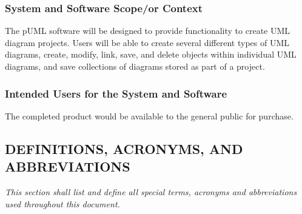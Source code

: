 \documentclass[twoside,letterpaper]{article}
\begin{document}
{\subsubsection[System and Software Scope/or Context]{System and Software
Scope/or Context}
{\color{black}
The pUML software will be designed to provide functionality to create UML diagram projects.  Users will be able to create several different types of UML diagrams, create, modify, link, save, and delete objects within individual UML diagrams, and save collections of diagrams stored as part of a project.
}

\subsubsection{Intended Users for the System and Software}
{\color{black}
The completed product would be available to the general public for purchase.
}


\clearpage
\subsection[DEFINITIONS, ACRONYMS, AND
ABBREVIATIONS]{\bfseries\color{black}
DEFINITIONS, ACRONYMS, AND ABBREVIATIONS}
{\itshape\color{black}
This section shall list and define all special terms, acronyms and
abbreviations used throughout this document.}


}
\end{document}
